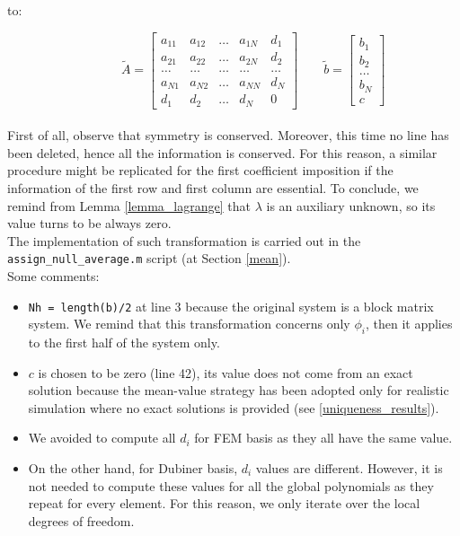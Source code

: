 \documentclass[a4paper,11pt]{article}
\begin{document}
\noindent to:

\begin{equation*}
\quad \quad  \quad \, \tilde{A}=\begin{bmatrix}
a_{11} & a_{12} & \dots & a_{1N} & d_1\\ 
a_{21} & a_{22} & \dots & a_{2N} & d_2 \\ 
\dots & \dots & \dots & \dots & \dots \\
a_{N1}  & a_{N2} & \dots & a_{NN} & d_N \\
d_1 & d_2 & \dots & d_N & 0
\end{bmatrix} \quad \quad
\tilde{b}=\begin{bmatrix}
b_1 \\ b_2 \\ \dots \\ b_N \\ c
\end{bmatrix}
\end{equation*}
\vspace{3mm} \\
\noindent First of all, observe that symmetry is conserved. Moreover, this time no line has been deleted, hence all the information is conserved. For this reason, a similar procedure might be replicated for the first coefficient imposition if the information of the first row and first column are essential. To conclude, we remind from Lemma \ref{lemma_lagrange} that $\lambda$ is an auxiliary unknown, so its value turns to be always zero. \\

\noindent The implementation of such transformation is carried out in the \texttt{assign\_null\_average.m} script (at Section \ref{mean}).\\
\vspace{2mm}
\noindent Some comments:
\begin{itemize}
	\item \texttt{Nh = length(b)/2} at line 3 because the original system is a block matrix system. We remind that this transformation concerns only $\phi_i$, then it applies to the first half of the system only.
	\item $c$ is chosen to be zero (line 42), its value does not come from an exact solution because the mean-value strategy has been adopted only for realistic simulation where no exact solutions is provided (see \ref{uniqueness_results}). 
	\item We avoided to compute all $d_i$ for FEM basis as they all have the same value.
	\item On the other hand, for Dubiner basis, $d_i$ values are different. However, it is not needed to compute these values for all the global polynomials as they repeat for every element. For this reason, we only iterate over the local degrees of freedom.
\end{itemize}
\end{document}
